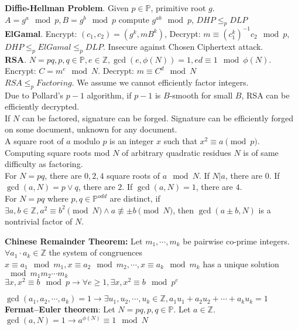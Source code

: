 \documentclass[10pt]{article}
\begin{document}
\begin{multicols}{2}
    \noindent
    \textbf{Diffie-Hellman Problem}. Given $p\in\mathbb{P}$, primitive root $g$. $A=g^a\mod{p},B=g^b\mod{p}$ compute $g^{ab}\mod{p}$, $DHP\leq_p DLP$\\
    \textbf{ElGamal}. Encrypt: $(c_1,c_2)=(g^k,mB^k)$, Decrypt: $m\equiv (c_1^k)^{-1}c_2\mod{p}$, $DHP\leq_p ElGamal \leq_p DLP$. Insecure against Chosen Ciphertext attack.\\
    \textbf{RSA}. $N=pq,p,q\in\mathbb{P},e\in\mathbb{Z},\gcd(e,\phi(N))=1,ed\equiv 1\mod{\phi(N)}$. Encrypt: $C=m^e\mod{N}$. Decrypt: $m\equiv C^d\mod{N}$\\
    $RSA\leq_p Factoring$. We assume we cannot efficiently factor integers.\\
    Due to Pollard's $p-1$ algorithm, if $p-1$ is $B$-smooth for small $B$, RSA can be efficiently decrypted.\\
    If $N$ can be factored, signature can be forged. Signature can be efficiently forged on some document, unknown for any document.\\
    A square root of $a$ modulo $p$ is an integer $x$ such that $x^2\equiv a \pmod p$.
    Computing square roots mod $N$ of arbitrary quadratic residues $N$ is of same difficulty as factoring.\\
    For $N=pq$, there are $0,2,4$ square roots of $a\mod{N}$. If $N|a$, there are $0$. If $\gcd(a,N)=p\lor q$, there are $2$.  If $\gcd(a,N)=1$, there are $4$.\\
    For $N=pq$ where $p,q\in \mathbb{P}^{odd}$ are distinct, if $\exists a,b \in \mathbb{Z}, a^2\equiv b^2 \pmod N\land a\not \equiv \pm b\pmod N$, then $\gcd(a \pm b, N)$ is a nontrivial factor of $N$.

    \noindent
    \textbf{Chinese Remainder Theorem:} Let $m_1,\cdots,m_k$ be pairwise co-prime integers. $\forall a_1\cdot a_k\in\mathbb{Z}$ the system of congruences\\
    $x\equiv a_1\mod{m_1},x\equiv a_2\mod{m_2},\cdots,x\equiv a_k\mod{m_k}$ has a unique solution $\mod{m_1m_2\cdots m_k}$\\
    $\exists x,x^2\equiv b\mod{p}\rightarrow \forall e\geq1,\exists x,x^2\equiv b\mod{p^e}$

    \noindent
    $\gcd(a_1,a_2,\cdots,a_k)=1\rightarrow \exists u_1,u_2,\cdots,u_k\in\mathbb{Z},a_1u_1+a_2u_2+\cdots+a_ku_k=1$\\
    \textbf{Fermat–Euler theorem}: Let $N=pq,p,q\in\mathbb{P}$. Let $a\in\mathbb{Z}$.\\
    $\gcd(a,N)=1\rightarrow a^{\phi(N)}\equiv 1\mod{N}$


\end{multicols}
\end{document}

